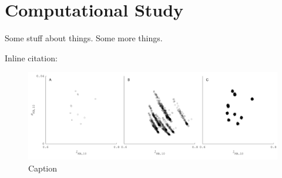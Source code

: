 \chapter{Computational Study}
\label{ComputationalStudyChapter}

Some stuff about things.\cite{example-citation} Some more things. 

Inline citation: 

\begin{figure}[hbp]
\includegraphics[width=\textwidth]{figs/comp/hypI.pdf}
\caption{Caption}
\label{fig:hypI}
\end{figure}


\blindtext
